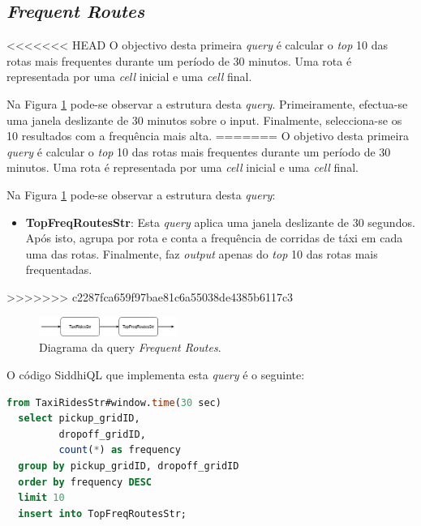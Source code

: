 \documentclass[article]{IEEEtran}
\begin{document}
\subsection{\textit{Frequent Routes}}

<<<<<<< HEAD
O objectivo desta primeira \textit{query} é calcular o \textit{top} 10 das rotas mais frequentes durante um período de 30 minutos. Uma rota é representada por uma \textit{cell} inicial e uma \textit{cell} final.

Na Figura \ref{fig:frequentRoutesDiagram} pode-se observar a estrutura desta \textit{query}. Primeiramente, efectua-se uma janela deslizante de 30 minutos sobre o input. Finalmente, selecciona-se os 10 resultados com a frequência mais alta.
=======
O objetivo desta primeira \textit{query} é calcular o \textit{top} 10 das rotas mais frequentes durante um período de 30 minutos. Uma rota é representada por uma \textit{cell} inicial e uma \textit{cell} final.

Na Figura \ref{fig:frequentRoutesDiagram} pode-se observar a estrutura desta \textit{query}:
\begin{itemize}
    \item \textbf{TopFreqRoutesStr}: Esta \textit{query} aplica uma janela deslizante de 30 segundos. Após isto, agrupa por rota e conta a frequência de corridas de táxi em cada uma das rotas. Finalmente, faz \textit{output} apenas do \textit{top} 10 das rotas mais frequentadas. 
\end{itemize} 
>>>>>>> c2287fca659f97bae81c6a55038de4385b6117c3

\begin{figure}[hbtp]
    \centering
        \includegraphics[width=0.4\textwidth]{images/frequentRoutes}
    \caption{Diagrama da query \textit{Frequent Routes}.}
    \label{fig:frequentRoutesDiagram}
\end{figure}

O código SiddhiQL que implementa esta \textit{query} é o seguinte:

\begin{lstlisting}[language=SQL]
  from TaxiRidesStr#window.time(30 sec)
  select pickup_gridID,
         dropoff_gridID,
         count(*) as frequency
  group by pickup_gridID, dropoff_gridID
  order by frequency DESC
  limit 10
  insert into TopFreqRoutesStr;
\end{lstlisting}
\end{document}
